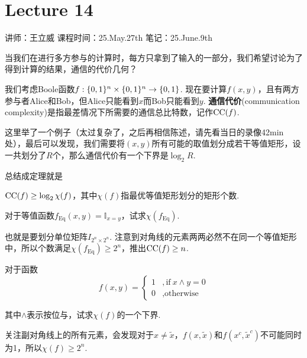 \chapter{Lecture 14}

\begin{center}
    讲师：王立威 \qquad
    课程时间：25.May.27th \qquad 
    笔记：25.June.9th
\end{center}

\bigskip

当我们在进行多方参与的计算时，每方只拿到了输入的一部分，我们希望讨论为了得到计算的结果，通信的代价几何？
\begin{definition}[通信代价]
    我们考虑Boole函数$f: \{0,1\}^n \times \{0,1\}^n \rightarrow \{0,1\}$. 现在要计算$f(x,y)$，且有两方参与者Alice和Bob，但Alice只能看到$x$而Bob只能看到$y$. \textbf{通信代价}(communication complexity)是指最差情况下所需要的通信总比特数，记作$\operatorname*{CC}(f)$.
\end{definition}

这里举了一个例子（太过复杂了，之后再相信陈述，请先看当日的录像42min处），最后可以发现，我们需要将$(x,y)$所有可能的取值划分成若干等值矩形，设一共划分了$R$个，那么通信代价有一个下界是$\log_2 R$.

总结成定理就是
\begin{theorem}
    $\operatorname*{CC}(f) \ge \log_2 \chi(f)$，其中$\chi(f)$指最优等值矩形划分的矩形个数. 
\end{theorem}

\begin{example}
    对于等值函数$f_\text{Eq}(x,y) = \mathbb{I}_{x=y}$，试求$\chi(f_\text{Eq})$.
\end{example}
\begin{solution}
    也就是要划分单位矩阵$I_{2^n \times 2^n}$. 注意到对角线的元素两两必然不在同一个等值矩形中，所以个数满足$\chi(f_\text{Eq}) \ge 2^n$，推出$\operatorname*{CC}(f)\ge n$.
\end{solution}

\begin{example}
    对于函数 
    \[
    f(x,y) = \begin{cases}
    1 &, \text{if} \ x\land y = 0 \\
    0 &, \text{otherwise}
    \end{cases}
    \]

    其中$\land$表示按位与，试求$\chi(f)$的一个下界.
\end{example} 
\begin{solution}
    关注副对角线上的所有元素，会发现对于$x\neq \tilde{x}$，$f(x,\tilde{x})$和$f(x^c, \tilde{x}^c)$不可能同时为1，所以$\chi(f) \ge 2^n$.
\end{solution}

